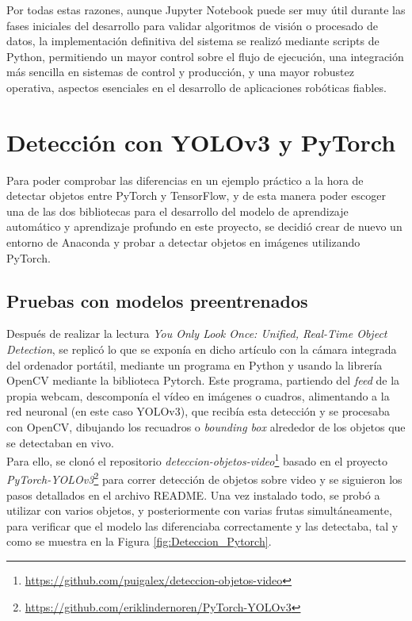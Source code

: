 Por todas estas razones, aunque Jupyter Notebook puede ser muy útil durante las fases iniciales del desarrollo para validar algoritmos de visión o procesado de datos, la implementación definitiva del sistema se realizó mediante scripts de Python, permitiendo un mayor control sobre el flujo de ejecución, una integración más sencilla en sistemas de control y producción, y una mayor robustez operativa, aspectos esenciales en el desarrollo de aplicaciones robóticas fiables.


\section{Detección con YOLOv3 y PyTorch}
\label{exp_seleccion_algoritmo}

Para poder comprobar las diferencias en un ejemplo práctico a la hora de detectar objetos entre PyTorch y TensorFlow, y de esta manera poder escoger una de las dos bibliotecas para el desarrollo del modelo de aprendizaje automático y aprendizaje profundo en este proyecto, se decidió crear de nuevo un entorno de Anaconda y probar a detectar objetos en imágenes utilizando PyTorch.

\subsection{Pruebas con modelos preentrenados}
\label{sec:Pruebas_modelo_preentrenado_Pytorch}

Después de realizar la lectura \textit{You Only Look Once: Unified, Real-Time Object Detection}\cite{Redmon16}, se replicó lo que se exponía en dicho artículo con la cámara integrada del ordenador portátil, mediante un programa en Python y usando la librería OpenCV mediante la biblioteca Pytorch. Este programa, partiendo del \textit{feed} de la propia webcam, descomponía el vídeo en imágenes o cuadros, alimentando a la red neuronal (en este caso YOLOv3), que recibía esta detección y se procesaba con OpenCV, dibujando los recuadros o \textit{bounding box} alrededor de los objetos que se detectaban en vivo.\\

Para ello, se clonó el repositorio \textit{deteccion-objetos-video}\footnote{\url{https://github.com/puigalex/deteccion-objetos-video}} basado en el proyecto \textit{PyTorch-YOLOv3}\footnote{\url{https://github.com/eriklindernoren/PyTorch-YOLOv3}} para correr detección de objetos sobre video y se siguieron los pasos detallados en el archivo README.
Una vez instalado todo, se probó a utilizar con varios objetos, y posteriormente con varias frutas simultáneamente, para verificar que el modelo las diferenciaba correctamente y las detectaba, tal y como se muestra en la Figura \ref{fig:Deteccion_Pytorch}.

